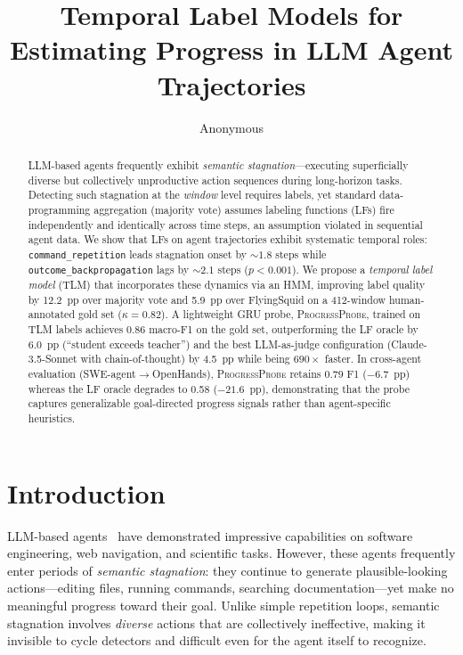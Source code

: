 \documentclass[11pt,a4paper]{article}
\title{Temporal Label Models for Estimating Progress in LLM Agent Trajectories}
\author{Anonymous}
\newcommand{\ours}{\textsc{ProgressProbe}}
\newcommand{\tlm}{\textsc{TLM}}
\begin{document}
\maketitle

\begin{abstract}
LLM-based agents frequently exhibit \emph{semantic stagnation}---executing superficially diverse but collectively unproductive action sequences during long-horizon tasks. Detecting such stagnation at the \emph{window} level requires labels, yet standard data-programming aggregation (majority vote) assumes labeling functions (LFs) fire independently and identically across time steps, an assumption violated in sequential agent data. We show that LFs on agent trajectories exhibit systematic temporal roles: \texttt{command\_repetition} leads stagnation onset by ${\sim}1.8$ steps while \texttt{outcome\_backpropagation} lags by ${\sim}2.1$ steps ($p{<}0.001$). We propose a \emph{temporal label model} (\tlm{}) that incorporates these dynamics via an HMM, improving label quality by 12.2~pp over majority vote and 5.9~pp over FlyingSquid on a 412-window human-annotated gold set ($\kappa{=}0.82$). A lightweight GRU probe, \ours{}, trained on \tlm{} labels achieves 0.86 macro-F1 on the gold set, outperforming the LF oracle by 6.0~pp (``student exceeds teacher'') and the best LLM-as-judge configuration (Claude-3.5-Sonnet with chain-of-thought) by 4.5~pp while being $690\times$ faster. In cross-agent evaluation (SWE-agent$\to$OpenHands), \ours{} retains 0.79 F1 ($-6.7$~pp) whereas the LF oracle degrades to 0.58 ($-21.6$~pp), demonstrating that the probe captures generalizable goal-directed progress signals rather than agent-specific heuristics.
\end{abstract}

\section{Introduction}
\label{sec:intro}

LLM-based agents~\cite{yao2023react,yang2024sweagent,wang2024opendevin} have demonstrated impressive capabilities on software engineering, web navigation, and scientific tasks. However, these agents frequently enter periods of \emph{semantic stagnation}: they continue to generate plausible-looking actions---editing files, running commands, searching documentation---yet make no meaningful progress toward their goal. Unlike simple repetition loops, semantic stagnation involves \emph{diverse} actions that are collectively ineffective, making it invisible to cycle detectors and difficult even for the agent itself to recognize.
\end{document}
